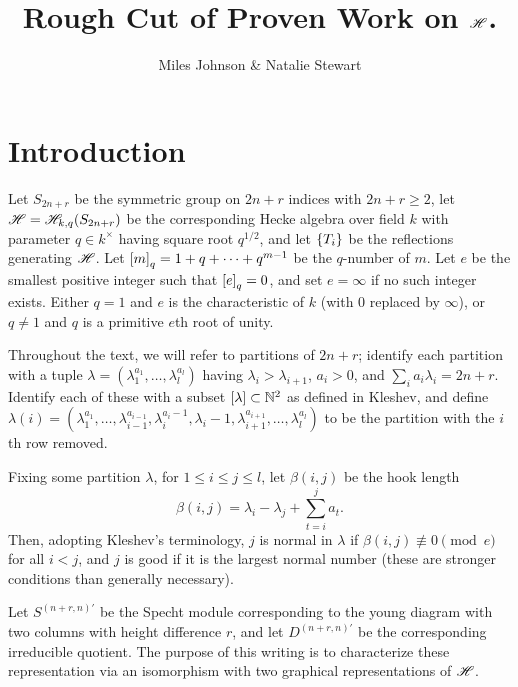 \documentclass{amsart}
\begin{document}
\title{Rough Cut of Proven Work on $\mathscr{H}$.}
\author{Miles Johnson \& Natalie Stewart}
\maketitle

\section{Introduction}
Let $S_{2n+r}$ be the symmetric group on $2n+r$ indices with $2n + r \geq 2$, let $\mathscr{H} = \mathscr{H}_{k,q}(S_{2n+r})$ be the corresponding Hecke algebra over field $k$ with parameter $q \in k^\times$ having square root $q^{1/2}$, and let $\left\{ T_i \right\}$ be the reflections generating $\mathscr{H}$.
Let $\left[ m \right]_q = 1 + q + \dots + q^{m-1}$ be the $q$-number of $m$. 
Let $e$ be the smallest positive integer such that $\left[ e \right]_q = 0$, and set $e = \infty$ if no such integer exists.
Either $q = 1$ and $e$ is the characteristic of $k$ (with $0$ replaced by $\infty$), or $q \neq 1$ and $q$ is a primitive $e$th root of unity.

Throughout the text, we will refer to partitions of $2n + r$;
identify each partition with a tuple $\lambda = (\lambda_1^{a_1},\dots,\lambda_l^{a_l})$ having $\lambda_i > \lambda_{i+1}$, $a_i > 0$, and $\sum_i a_i\lambda_i = 2n + r$.
Identify each of these with a subset $\left[ \lambda \right] \subset \mathbb{N}^2$ as defined in Kleshev, and define $\lambda(i) = (\lambda_1^{a_1},\dots,\lambda_{i-1}^{a_{i-1}},\lambda_i^{a_i - 1},\lambda_i-1,\lambda_{i+1}^{a_{i+1}},\dots,\lambda_l^{a_l})$ to be the partition with the $i$th row removed.

Fixing some partition $\lambda$, for $1 \leq i \leq j \leq l$, let $\beta(i,j)$ be the hook length
\[
  \beta(i,j) = \lambda_i - \lambda_j + \sum_{t = i}^j a_t.
\]
Then, adopting Kleshev's terminology, $j$ is normal in $\lambda$ if $\beta(i,j) \not\equiv 0 \pmod e$ for all $i < j$, and $j$ is good if it is the largest normal number (these are stronger conditions than generally necessary). 

Let $S^{(n+r,n)'}$ be the Specht module corresponding to the young diagram with two columns with height difference $r$, and let $D^{(n+r,n)'}$ be the corresponding irreducible quotient.
The purpose of this writing is to characterize these representation via an isomorphism with two graphical representations of $\mathscr{H}$.
\end{document}
